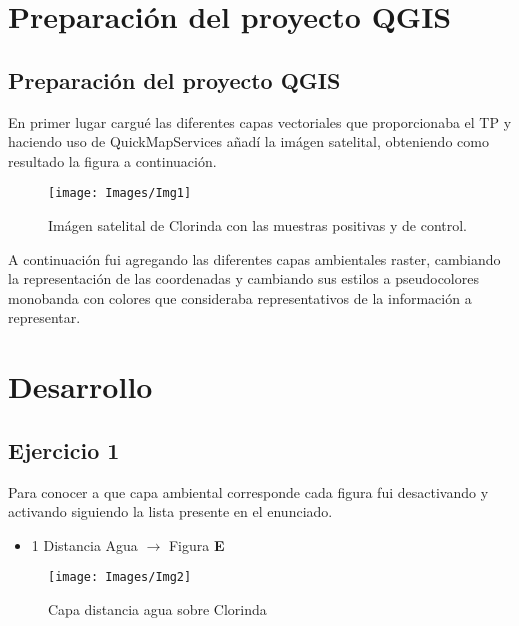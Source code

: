 \graphicspath{{Images/}}

\section{Preparación del proyecto QGIS}\label{cap:ej1}


\subsection{Preparación del proyecto QGIS}


En primer lugar cargué las diferentes capas vectoriales que proporcionaba el TP y haciendo uso de QuickMapServices añadí la imágen satelital, obteniendo como resultado la figura a continuación.

\begin{figure}[H]
	\centering
	\texttt{[image: Images/Img1]}
	\caption[]{Imágen satelital de Clorinda con las muestras positivas y de control.}
	\label{fig:img1}
\end{figure}

A continuación fui agregando las diferentes capas ambientales raster, cambiando la representación de las coordenadas y cambiando sus estilos a pseudocolores monobanda con colores que consideraba representativos de la información a representar.

\section{Desarrollo}

\subsection{Ejercicio 1}

Para conocer a que capa ambiental corresponde cada figura fui desactivando y activando siguiendo la lista presente en el enunciado.

\begin{itemize}
	\item 1 Distancia Agua $\rightarrow$ Figura \textbf{E}
\end{itemize}


\begin{figure}[H]
	\centering
	\texttt{[image: Images/Img2]}
	\caption{Capa distancia agua sobre Clorinda}
	\label{fig:img2}
\end{figure}

